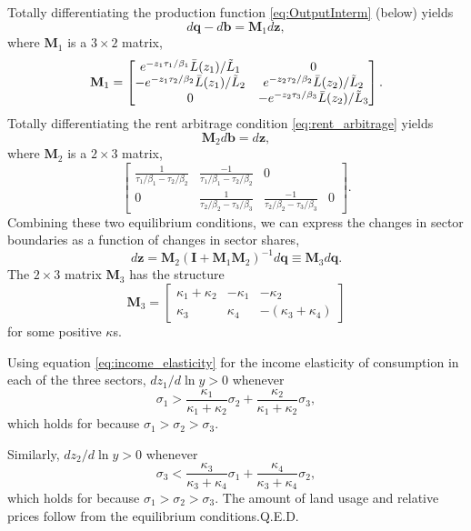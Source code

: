 \documentclass[12pt]{article}
\begin{document}
Totally differentiating the production function \eqref{eq:OutputInterm} (below) yields
\[
d\mathbf q - d\mathbf b = \mathbf M_1 d\mathbf z,
\]
where $\mathbf M_1$ is a $3\times2$ matrix,
\[
\mathbf M_1 =
\begin{bmatrix}
	e^{-z_1\tau_1/\beta_1}\Bar L(z_1)/\tilde L_1 & 0\\
	-e^{-z_1\tau_2/\beta_2}\Bar L(z_1)/\tilde L_2 &
		e^{-z_2\tau_2/\beta_2}\Bar L(z_2)/\tilde L_2\\
	0 & -e^{-z_2\tau_3/\beta_3}\Bar L(z_2)/\tilde L_3
\end{bmatrix}.
\]
Totally differentiating the rent arbitrage condition \eqref{eq:rent_arbitrage} yields
\[
\mathbf M_2 d\mathbf b = d\mathbf z,
\]
where $\mathbf M_2$ is a $2\times3$ matrix,
\[
\begin{bmatrix}
	\frac 1
		{\tau_1/\beta_1 - \tau_2/\beta_2}
	& 	\frac {-1}
		{\tau_1/\beta_1 - \tau_2/\beta_2}
	& 0 \\
	0
	& \frac 1
		{\tau_2/\beta_2 - \tau_3/\beta_3}
	& 	\frac {-1}
		{\tau_2/\beta_2 - \tau_3/\beta_3}
	& 0
\end{bmatrix}.
\]
Combining these two equilibrium conditions, we can express the changes in sector boundaries as a function of changes in sector shares,
\[
d\mathbf z = \mathbf M_2 (\mathbf I+\mathbf M_1\mathbf M_2)^{-1}d\mathbf q \equiv \mathbf M_3 d\mathbf q.
\]
The $2\times3$ matrix $\mathbf M_3$ has the structure
\[
\mathbf M_3 =
\begin{bmatrix}
\kappa_1+\kappa_2 	& -\kappa_1 	& -\kappa_2 \\
\kappa_3 			& \kappa_4		& -(\kappa_3+\kappa_4)
\end{bmatrix}
\]
for some positive $\kappa$s.

Using equation \eqref{eq:income_elasticity} for the income elasticity of consumption in each of the three sectors, $dz_1/d\ln y>0$ whenever
\[
\sigma_1> \frac{\kappa_1}{\kappa_1+\kappa_2}\sigma_2 + \frac{\kappa_2}{\kappa_1+\kappa_2}\sigma_3,
\]
which holds for because $\sigma_1>\sigma_2>\sigma_3$.

Similarly, $dz_2/d\ln y>0$ whenever
\[
\sigma_3 < \frac{\kappa_3}{\kappa_3+\kappa_4}\sigma_1 + \frac{\kappa_4}{\kappa_3+\kappa_4}\sigma_2,
\]
which holds for because $\sigma_1>\sigma_2>\sigma_3$. The amount of land usage and relative prices follow from the equilibrium conditions.\hfill Q.E.D.
\end{document}

